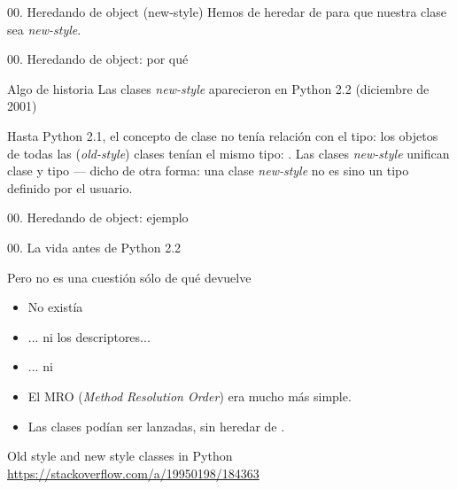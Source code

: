 
\begin{frame}{00. Heredando de object (new-style)}
  \centering
  \small
  Hemos de heredar de  para que nuestra clase sea
  \textit{new-style}.

  \footnotesize

\end{frame}

\begin{frame}{00. Heredando de object: por qué}
 \begin{block}{Algo de historia}
    \centering Las clases \textit{new-style} aparecieron en Python 2.2
    (diciembre de 2001)
  \end{block}

 \begin{justify}
   Hasta Python 2.1, el concepto de clase no tenía relación con el
   tipo: los objetos de todas las (\textit{old-style}) clases tenían
   el mismo tipo: .
   Las clases \textit{new-style} unifican clase y tipo — dicho de otra
   forma: una clase \textit{new-style} no es sino un tipo definido por
   el usuario.
 \end{justify}
\end{frame}

\begin{frame}{00. Heredando de object: ejemplo}
  \small
\end{frame}

\begin{frame}{00. La vida antes de Python 2.2}
 \begin{alertblock}{}
    \centering Pero no es una cuestión sólo de qué devuelve 
  \end{alertblock}

  \small
  \begin{itemize}
    \item No existía 
    \item ... ni los descriptores...
    \item ... ni 
    \item El MRO (\textit{Method Resolution Order}) era mucho más simple.
    \item Las clases podían ser lanzadas, sin heredar de .
  \end{itemize}

  \small
  \begin{block}{\centering Old style and new style classes in Python}
    \centering \url{https://stackoverflow.com/a/19950198/184363}
  \end{block}
\end{frame}

